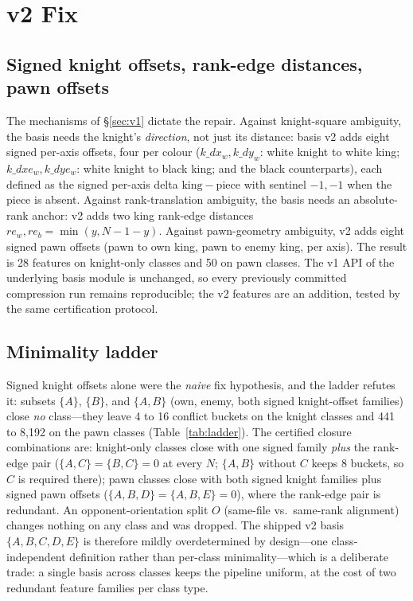 \documentclass[conference]{IEEEtran}
\begin{document}
\section{v2 Fix}
\label{sec:v2}

\subsection{Signed knight offsets, rank-edge distances, pawn offsets}
The mechanisms of \S\ref{sec:v1} dictate the repair. Against knight-square
ambiguity, the basis needs the knight's \emph{direction}, not just its
distance: basis v2 adds eight signed per-axis offsets, four per colour
($k\_dx_w, k\_dy_w$: white knight to white king; $k\_dxe_w, k\_dye_w$:
white knight to black king; and the black counterparts), each defined as
the signed per-axis delta $\mathrm{king} - \mathrm{piece}$ with sentinel
$-1,-1$ when the piece is absent. Against rank-translation ambiguity, the
basis needs an absolute-rank anchor: v2 adds two king rank-edge distances
$re_w, re_b = \min(y, N{-}1{-}y)$. Against pawn-geometry ambiguity, v2
adds eight signed pawn offsets (pawn to own king, pawn to enemy king, per
axis). The result is 28 features on knight-only classes and 50 on pawn
classes. The v1 API of the underlying basis module is unchanged, so every
previously committed compression run remains reproducible; the v2 features
are an addition, tested by the same certification protocol.

\subsection{Minimality ladder}
Signed knight offsets alone were the \emph{naive} fix hypothesis, and the
ladder refutes it: subsets $\{A\}$, $\{B\}$, and $\{A,B\}$ (own, enemy,
both signed knight-offset families) close \emph{no} class---they leave 4 to
16 conflict buckets on the knight classes and 441 to 8{,}192 on the pawn
classes (Table~\ref{tab:ladder}). The certified closure combinations are:
knight-only classes close with one signed family \emph{plus} the rank-edge
pair ($\{A,C\} = \{B,C\} = 0$ at every $N$; $\{A,B\}$ without $C$ keeps 8
buckets, so $C$ is required there); pawn classes close with both signed
knight families plus signed pawn offsets ($\{A,B,D\} = \{A,B,E\} = 0$),
where the rank-edge pair is redundant. An opponent-orientation split $O$
(same-file vs.\ same-rank alignment) changes nothing on any class and was
dropped. The shipped v2 basis $\{A,B,C,D,E\}$ is therefore mildly
overdetermined by design---one class-independent definition rather than
per-class minimality---which is a deliberate trade: a single basis across
classes keeps the pipeline uniform, at the cost of two redundant feature
families per class type.
\end{document}
